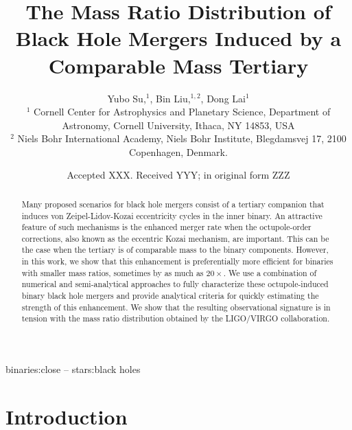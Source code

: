 \documentclass[
        fleqn,
        usenatbib,
    ]{mnras}
\title[Mass Ratio Distribution]{The Mass Ratio Distribution of
Black Hole Mergers Induced by a Comparable Mass Tertiary}
\author[Y. Su et\ al.]{
Yubo Su,$^1$,
Bin Liu,$^{1,2}$,
Dong Lai$^1$
\\
$^1$ Cornell Center for Astrophysics and Planetary Science, Department of
Astronomy, Cornell University, Ithaca, NY 14853, USA\\
$^2$ Niels Bohr International Academy, Niels Bohr Institute, Blegdamsvej 17,
2100 Copenhagen, Denmark.
}
\date{Accepted XXX\@. Received YYY\@; in original form ZZZ}
\begin{document}
\label{firstpage}
\pagerange{\pageref{firstpage}--\pageref{lastpage}}
\maketitle

\begin{abstract}
    Many proposed scenarios for black hole mergers consist of a tertiary
    companion that induces von Zeipel-Lidov-Kozai eccentricity cycles in the
    inner binary. An attractive feature of such mechanisms is the enhanced
    merger rate when the octupole-order corrections, also known as the eccentric
    Kozai mechanism, are important. This can be the case when the tertiary is of
    comparable mass to the binary components. However, in this work, we show
    that this enhancement is preferentially more efficient for binaries with
    smaller mass ratios, sometimes by as much as $20\times$. We use a
    combination of numerical and semi-analytical approaches to fully
    characterize these octupole-induced binary black hole mergers and provide
    analytical criteria for quickly estimating the strength of this enhancement.
    We show that the resulting observational signature is in tension with the
    mass ratio distribution obtained by the LIGO/VIRGO collaboration.
\end{abstract}

\begin{keywords}
binaries:close -- stars:black holes %
\end{keywords}

\section{Introduction}\label{s:intro}
\end{document}

